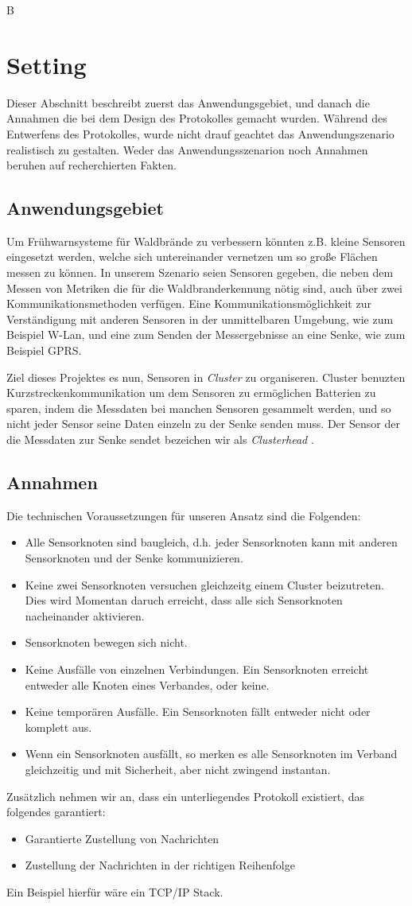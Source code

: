B\section{Setting} \label{sec:setting}
Dieser Abschnitt beschreibt zuerst das Anwendungsgebiet, und danach die Annahmen die bei dem Design des Protokolles gemacht wurden.
W\"ahrend des Entwerfens des Protokolles, wurde nicht drauf geachtet das Anwendungszenario realistisch zu gestalten. Weder das Anwendungsszenarion noch Annahmen beruhen auf recherchierten Fakten.

\subsection{Anwendungsgebiet}
Um Fr\"uhwarnsysteme f\"ur Waldbr\"ande zu verbessern k\"onnten z.B. kleine Sensoren eingesetzt werden, welche sich untereinander vernetzen um so gro\ss e Fl\"achen messen zu k\"onnen.
In unserem Szenario seien Sensoren gegeben, die neben dem Messen von Metriken die f\"ur die Waldbranderkennung n\"otig sind, auch \"uber zwei Kommunikationsmethoden verf\"ugen. Eine Kommunikationsm\"oglichkeit zur Verst\"andigung mit anderen Sensoren in der unmittelbaren Umgebung, wie zum Beispiel W-Lan, und eine zum Senden der Messergebnisse an eine Senke, wie zum Beispiel GPRS.

Ziel dieses Projektes es nun, Sensoren in \emph{Cluster} zu organiseren.
Cluster benuzten Kurzstreckenkommunikation um dem Sensoren zu erm\"oglichen Batterien zu sparen, indem die Messdaten bei manchen Sensoren gesammelt werden, und so nicht jeder Sensor seine Daten einzeln zu der Senke senden muss.
Der Sensor der die Messdaten zur Senke sendet bezeichen wir als \emph{Clusterhead} .

\subsection{Annahmen}
Die technischen Voraussetzungen f\"ur unseren Ansatz sind die Folgenden:
\begin{itemize}
\item Alle Sensorknoten sind baugleich, d.h. jeder Sensorknoten kann mit anderen Sensorknoten und der Senke kommunizieren.
\item Keine zwei Sensorknoten versuchen gleichzeitg einem Cluster beizutreten. Dies wird Momentan daruch erreicht, dass alle sich Sensorknoten nacheinander aktivieren.
\item Sensorknoten bewegen sich nicht.
\item Keine Ausf\"alle von einzelnen Verbindungen. Ein Sensorknoten erreicht entweder alle Knoten eines Verbandes, oder keine.
\item Keine tempor\"aren Ausf\"alle. Ein Sensorknoten f\"allt entweder nicht oder komplett aus.
\item Wenn ein Sensorknoten ausf\"allt, so merken es alle Sensorknoten im Verband gleichzeitig und mit Sicherheit, aber nicht zwingend instantan.
\end{itemize}

\noindent Zus\"atzlich nehmen wir an, dass ein unterliegendes Protokoll existiert, das folgendes garantiert:
\begin{itemize}
\item Garantierte Zustellung von Nachrichten
\item Zustellung der Nachrichten in der richtigen Reihenfolge
\end{itemize}
Ein Beispiel hierf\"ur w\"are ein TCP/IP Stack.
